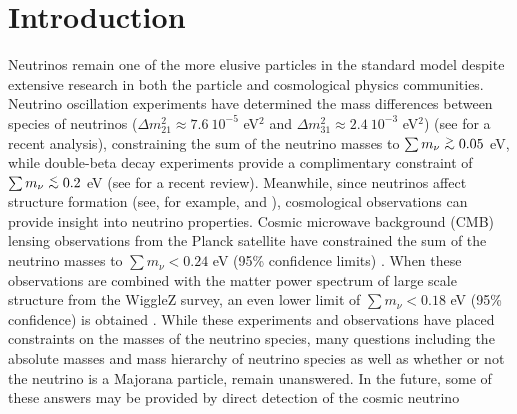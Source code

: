 \documentclass[twocolumn,superscriptaddress,prd]{revtex4}
\def\ltsima{$\; \buildrel < \over \sim \;$}
\def\lsim{\lower.5ex\hbox{\ltsima}}
\def\gtsima{$\; \buildrel > \over \sim \;$}
\def\gsim{\lower.5ex\hbox{\gtsima}}
\begin{document}
\maketitle



\section{Introduction}
\label{sec:Introduction}

Neutrinos remain one of the more elusive particles in the
standard model despite extensive research in both the particle and
cosmological physics communities.  Neutrino oscillation experiments
have determined the mass differences between species of
neutrinos ($\Delta m_{21}^2 \approx 7.6~10^{-5} $ eV$^2$ and
$\Delta m_{31}^2 \approx 2.4~10^{-3}$ eV$^2$) (see \cite{schwetz11} for
a recent analysis), constraining the sum of the neutrino
masses to $\sum m_\nu \gsim 0.05$ eV, while double-beta decay experiments
provide a complimentary constraint of  $\sum m_\nu \lsim 0.2$ eV (see
\cite{guzowski15} for a recent review). Meanwhile, since neutrinos affect
structure formation (see, for example, \cite{lesgourgues06} and
\cite{wong11}), cosmological observations can provide
 insight into neutrino properties.  
Cosmic microwave background (CMB) lensing observations from the Planck
satellite have constrained the sum of the neutrino masses to $\sum
m_\nu < 0.24$ eV (95\% confidence limits) \citep{planck15nu}.  When these observations are
combined with the matter power spectrum of large scale structure from
the WiggleZ survey, an even lower limit of $\sum m_\nu < 0.18$ eV (95\%
confidence) is obtained \citep{wigglez}. 
While these experiments and observations have placed constraints on
the 
masses of the neutrino species, many questions including the absolute masses and mass hierarchy of
neutrino species as well as whether or not the neutrino is a Majorana
particle,  remain unanswered.  In the future, some of these answers
may be provided by direct detection of the cosmic neutrino
\end{document}
